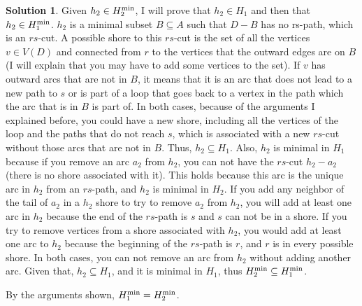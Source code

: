 \documentclass[11pt,leqno,final]{amsart}
\theoremstyle{definition}
\newtheorem{solution}{Solution}
\begin{document}
\begin{solution}
  Given $ h_2 \in H_{2}^{\textnormal{min}}$, I will prove that $ h_2 \in H_{1}$ and then that $ h_2 \in H_{1}^{\textnormal{min}}$. $h_2$ is a minimal subset $B \subseteq A$ such that $D - B$ has no rs-path, which is an $rs$-cut. A possible shore to this $rs$-cut is the set of all the vertices $v \in V(D)$ and connected from $r$ to the vertices that the outward edges are on $B$ (I will explain that you may have to add some vertices to the set). If $v$ has outward arcs that are not in $B$, it means that it is an arc that does not lead to a new path to $s$ or is part of a loop that goes back to a vertex in the path which the arc that is in $B$ is part of. In both cases, because of the arguments I explained before, you could have a new shore, including all the vertices of the loop and the paths that do not reach $s$, which is associated with a new $rs$-cut without those arcs that are not in $B$. Thus, $h_2 \subseteq H_{1}$. Also, $h_2$ is minimal in $H_1$ because if you remove an arc $a_2$ from $h_2$, you can not have the $rs$-cut $h_2 - a_2$ (there is no shore associated with it). This holds because this arc is the unique arc in $h_2$ from an $rs$-path, and $h_2$ is minimal in $H_2$. If you add any neighbor of the tail of $a_2$ in a $h_2$ shore to try to remove $a_2$ from $h_2$, you will add at least one arc in $h_2$ because the end of the $rs$-path is $s$ and $s$ can not be in a shore. If you try to remove vertices from a shore associated with $h_2$, you would add at least one arc to $h_2$ because the beginning of the $rs$-path is $r$, and $r$ is in every possible shore. In both cases, you can not remove an arc from $h_2$ without adding another arc. Given that, $h_2 \subseteq H_{1}$, and it is minimal in $H_1$, thus $H_{2}^{\textnormal{min}} \subseteq H_{1}^{\textnormal{min}}$.
  
  By the arguments shown, $H_{1}^{\textnormal{min}} = H_{2}^{\textnormal{min}}$.

\end{solution}
\end{document}
